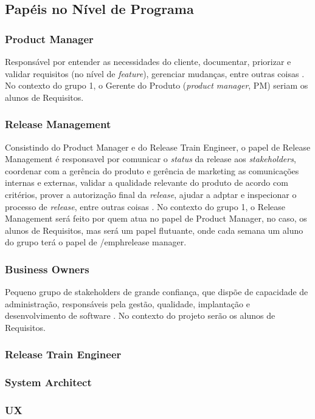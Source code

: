 \subsection{Papéis no Nível de Programa}

\subsubsection{Product Manager}
Responsável por entender as necessidades do cliente, documentar, priorizar e validar requisitos (no nível de \emph{feature}), gerenciar mudanças, entre outras coisas \cite[p. 283-287]{safe001}. No contexto do grupo 1, o Gerente do Produto (\emph{product manager}, PM) seriam os alunos de Requisitos.

\subsubsection{Release Management}
Consistindo do Product Manager e do Release Train Engineer, o papel de Release Management é responsavel por comunicar o \emph{status} da release aos \emph{stakeholders}, coordenar com a gerência do produto e gerência de marketing as comunicações internas e externas, validar a qualidade relevante do produto de acordo com critérios, prover a autorização final da \emph{release}, ajudar a adptar e inspecionar o processo de \emph{release}, entre outras coisas \cite{safesite001}.
No contexto do grupo 1, o Release Management será feito por quem atua no papel de Product Manager, no caso, os alunos de Requisitos, mas será um papel flutuante, onde cada semana um aluno do grupo terá o papel de /emph{release manager}.

\subsubsection{Business Owners}
Pequeno grupo de stakeholders de grande confiança, que dispõe de capacidade de administração, responsáveis pela gestão, qualidade, implantação e desenvolvimento de software \cite{safesite001}. No contexto do projeto serão os alunos de Requisitos.

\subsubsection{Release Train Engineer}
\subsubsection{System Architect}
\subsubsection{UX}
